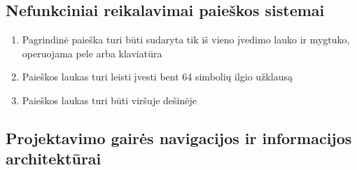 \documentclass{VUMIFPSkursinis}
\begin{document}
\subsection{Nefunkciniai reikalavimai paieškos sistemai}
\begin{enumerate}
	\item Pagrindinė paieška turi būti sudaryta tik iš vieno įvedimo lauko ir mygtuko, operuojama pele arba klaviatūra
	\item Paieškos laukas turi leisti įvesti bent 64 simbolių ilgio užklausą
	\item Paieškos laukas turi būti viršuje dešinėje
\end{enumerate}

\subsection{Projektavimo gairės navigacijos ir informacijos architektūrai}
\end{document}
